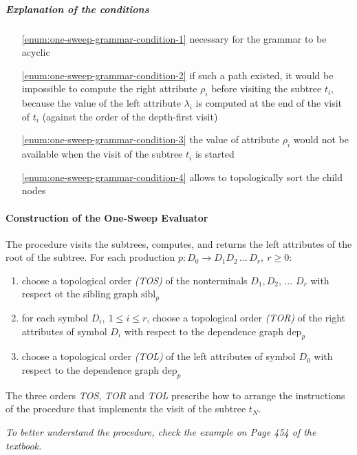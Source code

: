\documentclass[english]{article}
\begin{document}
\subparagraph*{Explanation of the conditions}

\begin{enumerate}
  \item[\ref{enum:one-sweep-grammar-condition-1}] necessary for the grammar to be acyclic
  \item[\ref{enum:one-sweep-grammar-condition-2}] if such a path existed, it would be impossible to compute the right attribute \(\rho_i\) before visiting the subtree \(t_i\), because the value of the left attribute \(\lambda_i\) is computed at the end of the visit of \(t_i\) (against the order of the depth-first visit)
  \item[\ref{enum:one-sweep-grammar-condition-3}] the value of attribute \(\rho_i\) would not be available when the visit of the subtree \(t_i\) is started
  \item[\ref{enum:one-sweep-grammar-condition-4}] allows to topologically sort the child nodes
\end{enumerate}

\paragraph{Construction of the One-Sweep Evaluator}

The procedure visits the subtrees, computes, and returns the left attributes of the root of the subtree.
For each production \(p : D_0 \rightarrow D_1 D_2 \,\ldots\, D_r, \ r \geq 0\):

\begin{enumerate}
  \item choose a topological order \textit{(TOS)} of the nonterminals \(D_1, D_2, \,\ldots\, \, D_r\) with respect ot the sibling graph \(\text{sibl}_p\)
  \item for each symbol \(D_i, \ 1 \leq i \leq r\), choose a topological order \textit{(TOR)} of the right attributes of symbol \(D_i\) with respect to the dependence graph \(\text{dep}_p\)
  \item choose a topological order \textit{(TOL)} of the left attributes of symbol \(D_0\) with respect to the dependence graph \(\text{dep}_p\)
\end{enumerate}

The three orders \textit{TOS}, \textit{TOR} and \textit{TOL} prescribe how to arrange the instructions of the procedure that implements the visit of the subtree \(t_N\).

\bigskip
\textit{To better understand the procedure, check the example on Page 454 of the textbook.}
\end{document}
